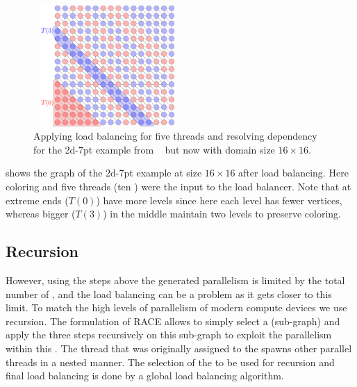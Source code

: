   \begin{figure}[t]
  	\begin{minipage}[c]{0.26\textwidth}
  	\includegraphics[height=12.4em,width=15.2em]{pics/race_method/load_balancing}
  	\end{minipage}\hspace{2.2em}
  	 \begin{minipage}[c]{0.16\textwidth}
  	\caption{\label{fig:lb} Applying load balancing for five threads and resolving \DTWO
  		dependency for the 2d-7pt example from ~ but now with domain size $16\times16$.  }
  	\end{minipage}
  \end{figure}
   
   shows the graph of the 2d-7pt example at size $16\times16$ after
   load balancing. Here \DTWO coloring and five threads
    (\ie ten \levelGroups) were the input to the load balancer.
    Note that \levelGroups at extreme ends (\eg $T(0)$) have more levels
    since here each level has fewer vertices, whereas bigger \levelGroups
    (\eg $T(3)$) in the middle maintain two levels to preserve \DK coloring.
    
\subsection{Recursion}
However, using the steps above the generated parallelism is limited by the total number
of \levels, and the load balancing can be a problem as it gets closer to this limit.
To match the high levels of parallelism of modern compute devices  we use recursion. The formulation of \acrshort{RACE} allows to simply select a \levelGroup (sub-graph) and apply the three
 steps recursively on this sub-graph to exploit the parallelism 
 within this \levelGroup. The thread that was originally assigned to the
 \levelGroup spawns other parallel threads in a nested manner. 
 The selection of the \levelGroup to be used for recursion and final load balancing 
 is done by  a global load balancing algorithm.
 
